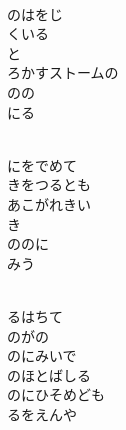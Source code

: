 \documentclass[10pt,b5j]{tarticle} %
\begin{document}
\begin{enumerate}
\begin{minipage}[c]{\blocksize}
        \vspace{\linespace}
        \item~\\
        のはをじ\\
        くいる\\
        と\\
        ろかすストームの\\
        のの\\
        にる
        
        \vspace{\linespace}
        \item~\\
        にをでめて\\
        きをつるとも\\
        あこがれきい\\
        き\\
        ののに\\
        みう
        
        \vspace{\linespace}
        \item~\\
        るはちて\\
        のがの\\
        のにみいで\\
        のほとばしる\\
        のにひそめども\\
        るをえんや
    
    \end{minipage}
\end{enumerate} %
\end{document}
